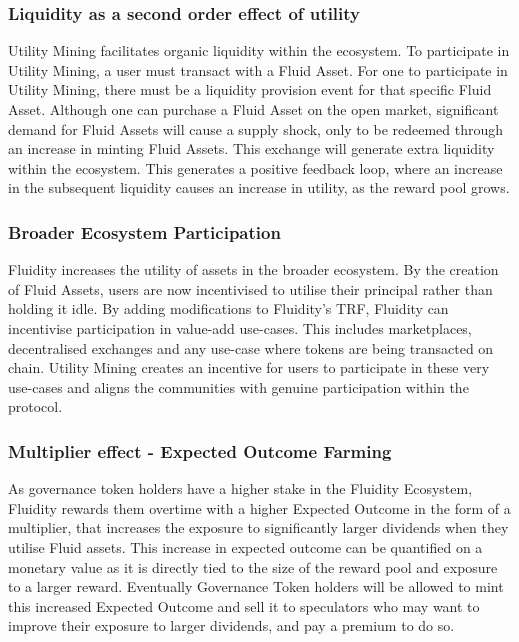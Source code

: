 \subsubsection{Liquidity as a second order effect of utility}

Utility Mining facilitates organic liquidity within the ecosystem. To participate in Utility Mining, a user must transact with a Fluid Asset. For one to participate in Utility Mining, there must be a liquidity provision event for that specific Fluid Asset. Although one can purchase a Fluid Asset on the open market, significant demand for Fluid Assets will cause a supply shock, only to be redeemed through an increase in minting Fluid Assets. This exchange will generate extra liquidity within the ecosystem. This generates a positive feedback loop, where an increase in the subsequent liquidity causes an increase in utility, as the reward pool grows.

\subsubsection{Broader Ecosystem Participation}
Fluidity increases the utility of assets in the broader ecosystem. By the creation of Fluid Assets, users are now incentivised to utilise their principal rather than holding it idle. By adding modifications to Fluidity's TRF, Fluidity can incentivise participation in value-add use-cases. This includes marketplaces, decentralised exchanges and any use-case where tokens are being transacted on chain. Utility Mining creates an incentive for users to participate in these very use-cases and aligns the communities with genuine participation within the protocol.

\subsubsection{Multiplier effect - Expected Outcome Farming}

As governance token holders have a higher stake in the Fluidity Ecosystem, Fluidity rewards them overtime with a higher Expected Outcome in the form of a multiplier, that increases the exposure to significantly larger dividends when they utilise Fluid assets. This increase in expected outcome can be quantified on a monetary value as it is directly tied to the size of the reward pool and exposure to a larger reward. Eventually Governance Token holders will be allowed to mint this increased Expected Outcome and sell it to speculators who may want to improve their exposure to larger dividends, and pay a premium to do so.

